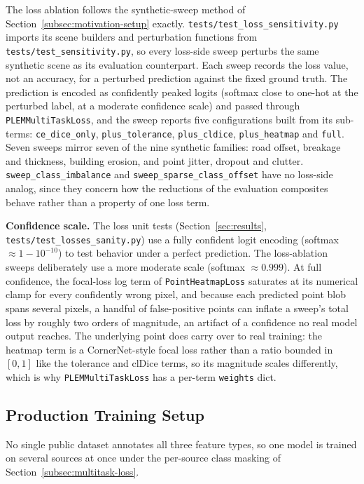 The loss ablation follows the synthetic-sweep method of Section~\ref{subsec:motivation-setup}
exactly. \texttt{tests/test\_loss\_sensitivity.py} imports its scene builders and perturbation
functions from \texttt{tests/test\_sensitivity.py}, so every loss-side sweep perturbs the same
synthetic scene as its evaluation counterpart. Each sweep records the loss value, not an accuracy,
for a perturbed prediction against the fixed ground truth. The prediction is encoded as
confidently peaked logits (softmax close to one-hot at the perturbed label, at a moderate
confidence scale) and passed through \texttt{PLEMMultiTaskLoss}, and the sweep reports five
configurations built from its sub-terms: \texttt{ce\_dice\_only}, \texttt{plus\_tolerance},
\texttt{plus\_cldice}, \texttt{plus\_heatmap} and \texttt{full}. Seven sweeps mirror seven of the
nine synthetic families: road offset, breakage and thickness, building erosion, and point jitter,
dropout and clutter. \texttt{sweep\_class\_imbalance} and \texttt{sweep\_sparse\_class\_offset}
have no loss-side analog, since they concern how the reductions of the evaluation composites
behave rather than a property of one loss term.

\textbf{Confidence scale.} The loss unit tests (Section~\ref{sec:results},
\texttt{tests/test\_losses\_sanity.py}) use a fully confident logit encoding (softmax
$\approx 1-10^{-10}$) to test behavior under a perfect prediction. The loss-ablation sweeps
deliberately use a more moderate scale (softmax $\approx 0.999$). At full confidence, the
focal-loss log term of \texttt{PointHeatmapLoss} saturates at its numerical clamp for every
confidently wrong pixel, and because each predicted point blob spans several pixels, a handful of
false-positive points can inflate a sweep's total loss by roughly two orders of magnitude, an
artifact of a confidence no real model output reaches. The underlying point does carry over to
real training: the heatmap term is a CornerNet-style focal loss rather than a ratio bounded in
$[0,1]$ like the tolerance and clDice terms, so its magnitude scales differently, which is why
\texttt{PLEMMultiTaskLoss} has a per-term \texttt{weights} dict.

\subsection{Production Training Setup}
\label{subsec:scaled-setup}

No single public dataset annotates all three feature types, so one model is trained on several
sources at once under the per-source class masking of Section~\ref{subsec:multitask-loss}.

